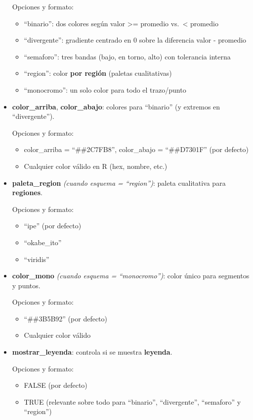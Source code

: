 \documentclass[
  11pt,
  letterpaper,
  DIV=11,
  numbers=noendperiod]{scrartcl}
\begin{document}
\begin{itemize}
  Opciones y formato:

  \begin{itemize}
  \item
    ``binario'': dos colores según valor \textgreater= promedio
    vs.~\textless{} promedio
  \item
    ``divergente'': gradiente centrado en 0 sobre la diferencia valor -
    promedio
  \item
    ``semaforo'': tres bandas (bajo, en torno, alto) con tolerancia
    interna
  \item
    ``region'': color \textbf{por región} (paletas cualitativas)
  \item
    ``monocromo'': un solo color para todo el trazo/punto
  \end{itemize}
\item
  \textbf{color\_arriba}, \textbf{color\_abajo}: colores para
  ``binario'' (y extremos en ``divergente'').

  Opciones y formato:

  \begin{itemize}
  \item
    color\_arriba = ``\#\#2C7FB8'', color\_abajo = ``\#\#D7301F'' (por
    defecto)
  \item
    Cualquier color válido en R (hex, nombre, etc.)
  \end{itemize}
\item
  \textbf{paleta\_region} \emph{(cuando esquema = ``region'')}: paleta
  cualitativa para \textbf{regiones}.

  Opciones y formato:

  \begin{itemize}
  \item
    ``ipe'' (por defecto)
  \item
    ``okabe\_ito''
  \item
    ``viridis''
  \end{itemize}
\item
  \textbf{color\_mono} \emph{(cuando esquema = ``monocromo'')}: color
  único para segmentos y puntos.

  Opciones y formato:

  \begin{itemize}
  \item
    ``\#\#3B5B92'' (por defecto)
  \item
    Cualquier color válido
  \end{itemize}
\item
  \textbf{mostrar\_leyenda}: controla si se muestra \textbf{leyenda}.

  Opciones y formato:

  \begin{itemize}
  \item
    FALSE (por defecto)
  \item
    TRUE (relevante sobre todo para ``binario'', ``divergente'',
    ``semaforo'' y ``region'')
  \end{itemize}
\end{itemize}
\end{document}
